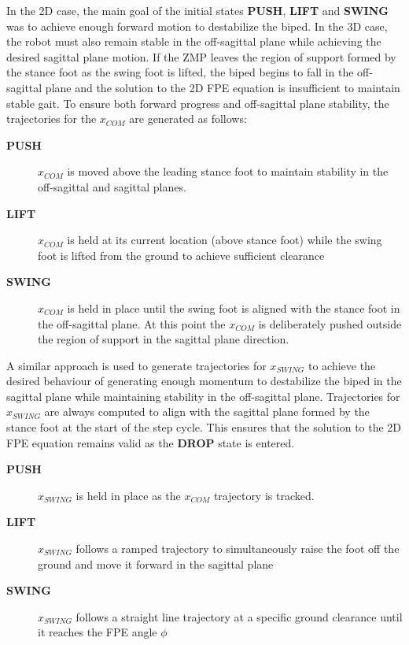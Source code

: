 
In the 2D case, the main goal of the initial states \textbf{PUSH}, \textbf{LIFT} and \textbf{SWING} was to achieve enough forward motion to destabilize the biped. In the 3D case, the robot must also remain stable in the off-sagittal plane while achieving the desired sagittal plane motion. If the ZMP leaves the region of support formed by the stance foot as the swing foot is lifted, the biped begins to fall in the off-sagittal plane and the solution to the 2D FPE equation is insufficient to maintain stable gait. To ensure both forward progress and off-sagittal plane stability, the trajectories for the $x_{COM}$ are generated as follows:

\begin{description}
	\item[\textbf{PUSH}] $x_{COM}$ is moved above the leading stance foot to maintain stability in the off-sagittal and sagittal planes.
	\item[\textbf{LIFT}] $x_{COM}$ is held at its current location (above stance foot) while the swing foot is lifted from the ground to achieve sufficient clearance
	\item[\textbf{SWING}] $x_{COM}$ is held in place until the swing foot is aligned with the stance foot in the off-sagittal plane. At this point the $x_{COM}$ is deliberately pushed outside the region of support in the sagittal plane direction.
\end{description}

A similar approach is used to generate trajectories for $x_{SWING}$ to achieve the desired behaviour of generating enough momentum to destabilize the biped in the sagittal plane while maintaining stability in the off-sagittal plane. Trajectories for $x_{SWING}$ are always computed to align with the sagittal plane formed by the stance foot at the start of the step cycle. This ensures that the solution to the 2D FPE equation remains valid as the \textbf{DROP} state is entered.

\begin{description}
	\item[\textbf{PUSH}] $x_{SWING}$ is held in place as the $x_{COM}$ trajectory is tracked.
	\item[\textbf{LIFT}] $x_{SWING}$ follows a ramped trajectory to simultaneously raise the foot off the ground and move it forward in the sagittal plane
	\item[\textbf{SWING}] $x_{SWING}$ follows a straight line trajectory at a specific ground clearance until it reaches the FPE angle $\phi$
\end{description}

